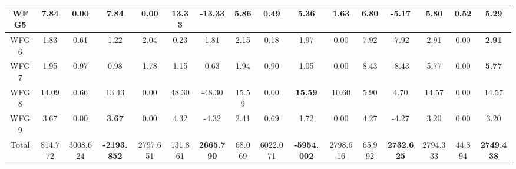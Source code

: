 \begin{table}[h]
{\begin{tabular}{|c|c|c|c|c|c|c|c|c|c|c|c|c|c|c|c|}
WFG5 & 7.84 & 0.00 & \textbf{7.84} & 0.00 & 13.33 & -13.33 & 5.86 & 0.49 & 5.36 & 1.63 & 6.80 & -5.17 & 5.80 & 0.52 & 5.29 \\ \hline
WFG6 & 1.83 & 0.61 & 1.22 & 2.04 & 0.23 & 1.81 & 2.15 & 0.18 & 1.97 & 0.00 & 7.92 & -7.92 & 2.91 & 0.00 & \textbf{2.91} \\ \hline
WFG7 & 1.95 & 0.97 & 0.98 & 1.78 & 1.15 & 0.63 & 1.94 & 0.90 & 1.05 & 0.00 & 8.43 & -8.43 & 5.77 & 0.00 & \textbf{5.77} \\ \hline
WFG8 & 14.09 & 0.66 & 13.43 & 0.00 & 48.30 & -48.30 & 15.59 & 0.00 & \textbf{15.59} & 10.60 & 5.90 & 4.70 & 14.57 & 0.00 & 14.57 \\ \hline
WFG9 & 3.67 & 0.00 & \textbf{3.67} & 0.00 & 4.32 & -4.32 & 2.41 & 0.69 & 1.72 & 0.00 & 4.27 & -4.27 & 3.20 & 0.00 & 3.20 \\ \hline
Total & 814.772 & 3008.624 & \textbf{-2193.852} & 2797.651 & 131.861 & \textbf{2665.790} & 68.069 & 6022.071 & \textbf{-5954.002} & 2798.616 & 65.992 & \textbf{2732.625} & 2794.333 & 44.894 & \textbf{2749.438} \\ \hline
\end{tabular}%
}
\end{table}


